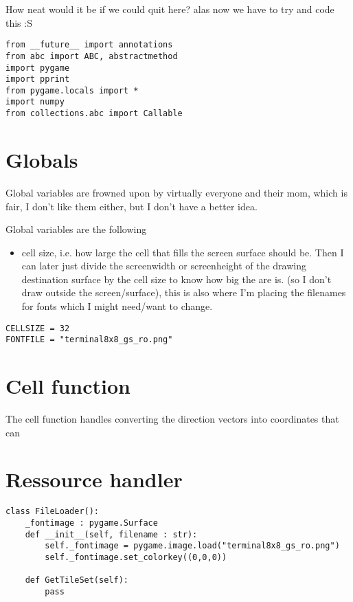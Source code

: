 \documentclass[11pt]{article}
\begin{document}
How neat would it be if we could quit here? alas now we have to try and code this :S 




\begin{verbatim}
from __future__ import annotations
from abc import ABC, abstractmethod
import pygame
import pprint
from pygame.locals import *
import numpy
from collections.abc import Callable
\end{verbatim}

\section{Globals}
\label{sec:org5a089d0}

Global variables are frowned upon by virtually everyone and their mom, which is fair, I don't like them either, but I don't have a better idea.

Global variables are the following
\begin{itemize}
\item cell size, i.e. how large the cell that fills the screen surface should be. Then I can later just divide the screenwidth or screenheight of the drawing destination surface by the cell size to know how big the are is. (so I don't draw outside the screen/surface), this is also where I'm placing the filenames for fonts which I might need/want to change.
\end{itemize}


\begin{verbatim}
CELLSIZE = 32
FONTFILE = "terminal8x8_gs_ro.png"
\end{verbatim}

\section{Cell function}
\label{sec:org3f91f69}

The cell function handles converting the direction vectors into coordinates that can 


\section{Ressource handler}
\label{sec:orge9cba99}

\begin{verbatim}
class FileLoader():
    _fontimage : pygame.Surface
    def __init__(self, filename : str):
        self._fontimage = pygame.image.load("terminal8x8_gs_ro.png")
        self._fontimage.set_colorkey((0,0,0))

    def GetTileSet(self):
        pass
\end{verbatim}
\end{document}
